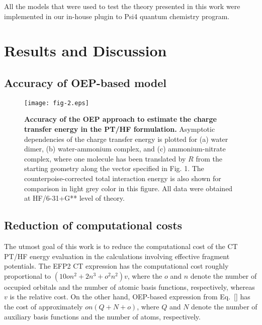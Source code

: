 All the models that were used to test the theory presented in this work
were implemented in our in\hyp{}house plugin to {\sc Psi4} quantum chemistry program.\cite{Psi4.JCTC.2017}

\section{\label{s:fwefsdv}Results and Discussion}

\subsection{\label{s:gsdzdv}Accuracy of OEP-based model}
%
\begin{figure}[t]
\texttt{[image: fig-2.eps]}
\caption{\label{f:fig-1} {\bf Accuracy of the OEP approach to estimate the charge transfer energy
in the PT/HF formulation.} 
Asymptotic dependencies of the charge transfer energy is plotted for 
(a) water dimer, 
(b) water\hyp{}ammonium complex, and 
(c) ammonium\hyp{}nitrate complex,
where one molecule has been translated by $R$ from the starting geometry
along the vector specified in Fig. 1.
The counterpoise\hyp{}corrected total interaction energy
is also shown for comparison in light grey color in this figure.
All data were obtained at HF/6-31+G** level of theory.
} 
\end{figure}
%


\subsection{\label{s:413s6}Reduction of computational costs}

The utmost goal of this work is to reduce the computational cost of
the CT PT/HF energy evaluation in the calculations involving effective fragment
potentials. The EFP2 CT expression has the computational cost
roughly proportional to $(10on^2 + 2n^3 + o^2n^2)v$, where the
$o$ and $n$ denote the number of occupied orbitals and the number of atomic basis functions,
respectively, whereas $v$ is the relative cost. On the other hand, OEP\hyp{}based expression
from Eq.~\eqref{} has the cost of approximately $on(Q+N+o)$, where 
$Q$ and $N$ denote the number of auxiliary basis functions and the number of atoms,
respectively. 


